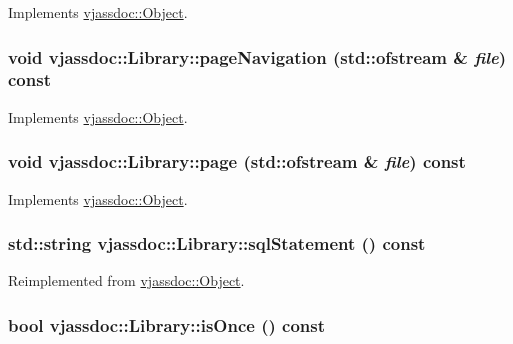 Implements \hyperlink{classvjassdoc_1_1Object_bd43e77dbe80055f5adda67661dfaca4}{vjassdoc::Object}.\hypertarget{classvjassdoc_1_1Library_782d6d0f5d58756924f0ab413821967a}{
\subsubsection{\setlength{\rightskip}{0pt plus 5cm}void vjassdoc::Library::pageNavigation (std::ofstream \& {\em file}) const}}
\label{classvjassdoc_1_1Library_782d6d0f5d58756924f0ab413821967a}




Implements \hyperlink{classvjassdoc_1_1Object_736bbb6719edd8070d8f56c364a2764c}{vjassdoc::Object}.\hypertarget{classvjassdoc_1_1Library_b49718631812ed3a5bcfe0a5bdf7595e}{
\subsubsection{\setlength{\rightskip}{0pt plus 5cm}void vjassdoc::Library::page (std::ofstream \& {\em file}) const}}
\label{classvjassdoc_1_1Library_b49718631812ed3a5bcfe0a5bdf7595e}




Implements \hyperlink{classvjassdoc_1_1Object_a0489e38956f3507566b1bc6e3e2c8af}{vjassdoc::Object}.\hypertarget{classvjassdoc_1_1Library_21dd8d48803fa96b2b22cb9846c9b915}{
\subsubsection{\setlength{\rightskip}{0pt plus 5cm}std::string vjassdoc::Library::sqlStatement () const}}
\label{classvjassdoc_1_1Library_21dd8d48803fa96b2b22cb9846c9b915}




Reimplemented from \hyperlink{classvjassdoc_1_1Object_4e8ebbb0ce5b0bf91ec847b1e4a9f8fc}{vjassdoc::Object}.\hypertarget{classvjassdoc_1_1Library_c80f46bebe911d249c7d7fdbc9fa3f5b}{
\subsubsection{\setlength{\rightskip}{0pt plus 5cm}bool vjassdoc::Library::isOnce () const}}
\label{classvjassdoc_1_1Library_c80f46bebe911d249c7d7fdbc9fa3f5b}


